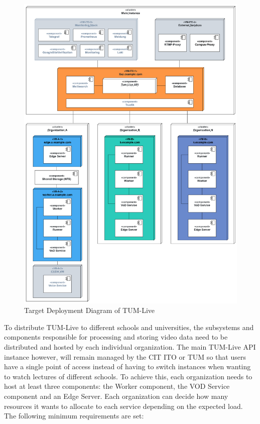 \begin{figure}[htbp]
    \centering
    \includegraphics[width=400pt]{images/DeploymentDiagramNew.png}
    \caption[Target Deployment Diagram of TUM-Live]{Target Deployment Diagram of TUM-Live\footnotemark[5]}
    \label{fig:system-architecture}
\end{figure}

To distribute TUM-Live to different schools and universities, the subsystems and components responsible for processing and storing video data need to be distributed and hosted by each individual organization. 
The main TUM-Live \ac{API} instance however, will remain managed by the \ac{CIT} \ac{ITO} or \ac{TUM} so that users have a single point of access instead of having to switch instances when wanting to watch lectures of different schools.
To achieve this, each organization needs to host at least three components: the Worker component, the VOD Service component and an Edge Server. 
Each organization can decide how many resources it wants to allocate to each service depending on the expected load. The following minimum requirements are set:

